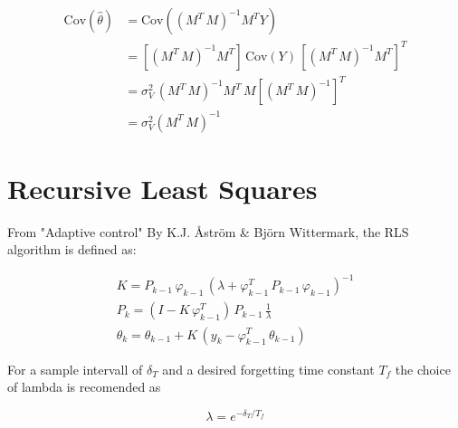 \documentclass{article}
\begin{document}
\begin{equation}
\begin{split}
\text{Cov}(\hat \theta) &= \text{Cov}((M^T \, M)^{-1} M^T Y) \\
& = \left[(M^T \, M)^{-1} M^T \right] \, \text{Cov}(Y) \, \left[(M^T \, M)^{-1} M^T \right]^T \\
& = \sigma_V^2 \, (M^T \, M)^{-1} M^T \, M \left[(M^T \, M)^{-1}  \right]^T \\
& = \sigma_V^2 (M^T \, M)^{-1}
\end{split}
\end{equation}


\section{Recursive Least Squares}
From "Adaptive control" By K.J. Åström \& Björn Wittermark, the RLS algorithm is defined as:

\begin{gather}
K = P_{k-1} \, \varphi_{k-1} \, (\lambda + \varphi_{k-1}^T \, P_{k-1} \, \varphi_{k-1})^{-1} \\
P_k = (I - K\, \varphi_{k-1}^T) \, P_{k-1} \, \frac{1}{\lambda} \\
\theta_k = \theta_{k-1} + K \, (y_k - \varphi_{k-1}^T \, \theta_{k-1})
\end{gather}

For a sample intervall of $\delta_T$ and a desired forgetting time constant $T_f$ the choice of lambda is recomended as

\begin{equation}
\lambda = e^{-\delta_T/T_f}
\end{equation}
\end{document}
